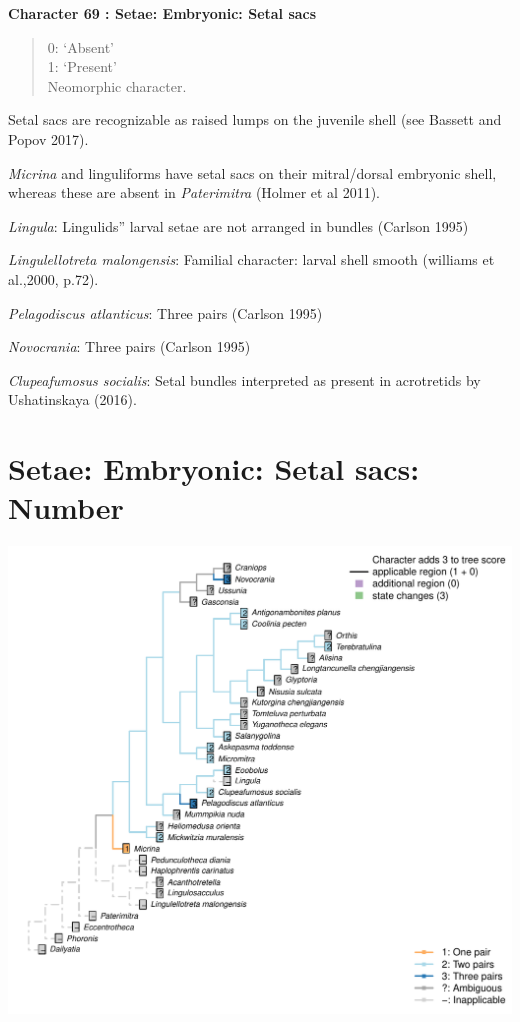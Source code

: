 \documentclass[]{book}
\theoremstyle{definition}
\theoremstyle{definition}
\theoremstyle{definition}
\theoremstyle{remark}
\begin{document}
\textbf{Character 69 : Setae: Embryonic: Setal sacs }

\begin{quote}
0: `Absent'\\
1: `Present'\\
Neomorphic character.
\end{quote}

Setal sacs are recognizable as raised lumps on the juvenile shell (see
Bassett and Popov 2017).

\emph{Micrina} and linguliforms have setal sacs on their mitral/dorsal
embryonic shell, whereas these are absent in \emph{Paterimitra} (Holmer
et al 2011).

\emph{Lingula}: Lingulids'' larval setae are not arranged in bundles
(Carlson 1995)

\emph{Lingulellotreta malongensis}: Familial character: larval shell
smooth (williams et al.,2000, p.72).

\emph{Pelagodiscus atlanticus}: Three pairs (Carlson 1995)

\emph{Novocrania}: Three pairs (Carlson 1995)

\emph{Clupeafumosus socialis}: Setal bundles interpreted as present in
acrotretids by Ushatinskaya (2016).

\hypertarget{setae-embryonic-setal-sacs-number}{%
\section*{Setae: Embryonic: Setal sacs:
Number}\label{setae-embryonic-setal-sacs-number}}

\includegraphics{Brachiopod_phylogeny_files/figure-latex/unnamed-chunk-5-70.pdf}
\end{document}
